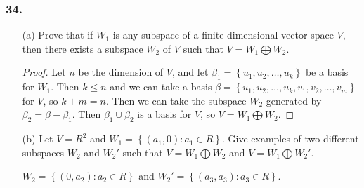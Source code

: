\documentclass{article}
\begin{document}
\subsubsection*{34.}
\begin{enumerate}
	\item[(a)] Prove that if $W_1$ is any subspace of a finite-dimensional vector space $V$, then there exists a subspace $W_2$ of $V$ such that $V = W_1 \bigoplus W_2$.
	
	\begin{proof}
		Let $n$ be the dimension of $V$, and let $\beta_1 = \left\{u_1, u_2, \dots, u_k\right\}$ be a basis for $W_1$. Then $k \le n$ and we can take a basis $\beta = \left\{u_1, u_2, \dots, u_k, v_1, v_2, \dots, v_m\right\}$ for $V$, so $k + m = n$. Then we can take the subspace $W_2$ generated by $\beta_2 = \beta - \beta_1$. Then $\beta_1 \cup \beta_2$ is a basis for $V$, so $V = W_1 \bigoplus W_2$. 
	\end{proof}

	\item[(b)] Let $V = R^2$ and $W_1 = \left\{(a_1, 0): a_1 \in R\right\}$. Give examples of two different subspaces $W_2$ and ${W_2}'$ such that $V = W_1 \bigoplus W_2$ and $V = W_1 \bigoplus {W_2}'$.
	
	$W_2 = \left\{(0, a_2): a_2 \in R\right\}$ and ${W_2}' = \left\{(a_3, a_3): a_3 \in R\right\}$.
\end{enumerate}
\end{document}
